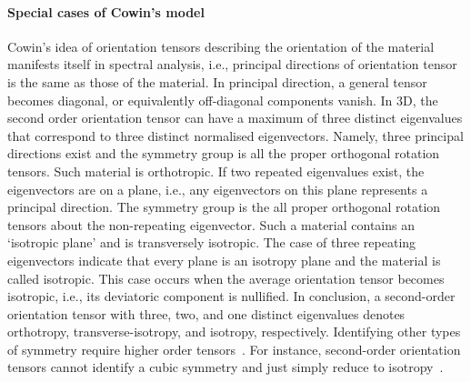 	\paragraph{Special cases of Cowin's model} Cowin's idea of orientation tensors describing the orientation of the material manifests itself in spectral analysis, i.e., principal directions of orientation tensor is the same as those of the material. In principal direction, a general tensor becomes diagonal, or equivalently off-diagonal components vanish. In 3D, the second order orientation tensor can have a maximum of three distinct eigenvalues that correspond to three distinct normalised eigenvectors. Namely, three principal directions exist and the symmetry group is all the proper orthogonal rotation tensors. Such material is orthotropic. If two repeated eigenvalues exist, the eigenvectors are on a plane, i.e., any eigenvectors on this plane represents a principal direction. The symmetry group is the all proper orthogonal rotation tensors about the non-repeating eigenvector. Such a material contains an `isotropic plane' and is transversely isotropic. The case of three repeating eigenvectors indicate that every plane is an isotropy plane and the material is called isotropic. This case occurs when the average orientation tensor becomes isotropic, i.e., its deviatoric component is nullified. In conclusion, a second-order orientation tensor with three, two, and one distinct eigenvalues denotes orthotropy, transverse-isotropy, and isotropy, respectively. Identifying other types of symmetry require higher order tensors~\autocite{Shertzer.2011}. For instance, second-order orientation tensors cannot identify a cubic symmetry and just simply reduce to isotropy~\autocite{Cowin.1985}.


	
